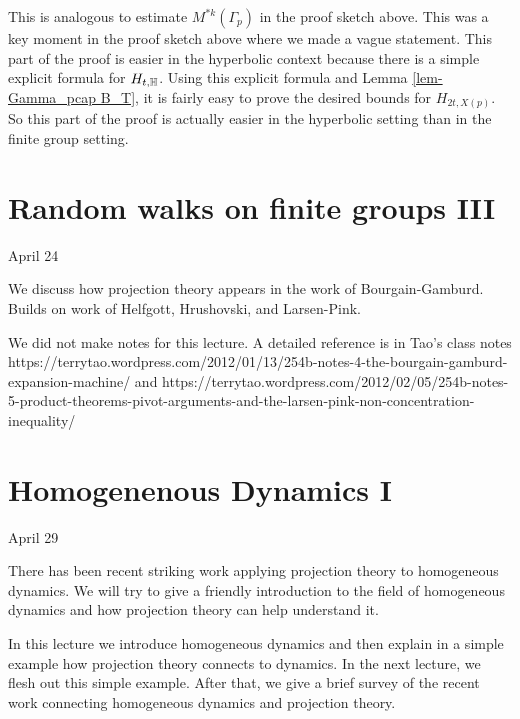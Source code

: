 \documentclass[12pt]{amsart}
\begin{document}
This is analogous to estimate $M^{*k}(\Gamma_p)$ in the proof sketch above.   This was a key moment in the proof sketch above where we made a vague statement.   This part of the proof is easier in the hyperbolic context because there is a simple explicit formula for $H_{t, \mathbb{H}}$.   Using this explicit formula and Lemma \ref{lem-Gamma_pcap B_T},  it is fairly easy to prove the desired bounds for $H_{2t, X(p)}$.   So this part of the proof is actually easier in the hyperbolic setting than in the finite group setting.  


\newpage

\section{Random walks on finite groups III}

April 24

We discuss how projection theory appears in the work of Bourgain-Gamburd.  Builds on work of Helfgott,  Hrushovski,  and Larsen-Pink.

We did not make notes for this lecture.   A detailed reference is in Tao's class notes https://terrytao.wordpress.com/2012/01/13/254b-notes-4-the-bourgain-gamburd-expansion-machine/ and https://terrytao.wordpress.com/2012/02/05/254b-notes-5-product-theorems-pivot-arguments-and-the-larsen-pink-non-concentration-inequality/



\newpage

\section{Homogenenous Dynamics I}

April 29

There has been recent striking work applying projection theory to homogeneous dynamics.   We will try to give a friendly introduction to the field of homogeneous dynamics and how projection theory can help understand it.

In this lecture  we introduce homogeneous dynamics and then explain in a simple example how projection theory connects to dynamics.   
In the next lecture,  we flesh out this simple example.   After that,  we give a brief survey of the recent work connecting homogeneous dynamics and projection theory.   
\end{document}
